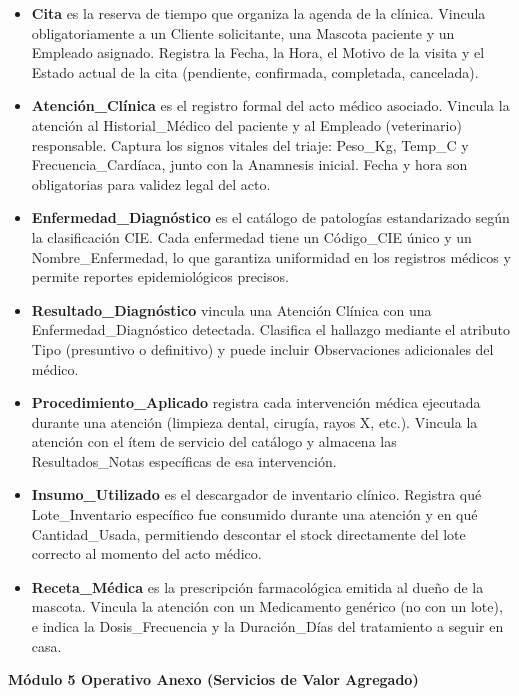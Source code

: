 \begin{itemize}
	\item \textbf{Cita} es la reserva de tiempo que organiza la agenda de la clínica. Vincula obligatoriamente a un Cliente solicitante, una Mascota paciente y un Empleado asignado. Registra la Fecha, la Hora, el Motivo de la visita y el Estado actual de la cita (pendiente, confirmada, completada, cancelada).
	\item \textbf{Atención\_Clínica} es el registro formal del acto médico asociado. Vincula la atención al Historial\_Médico del paciente y al Empleado (veterinario) responsable. Captura los signos vitales del triaje: Peso\_Kg, Temp\_C y Frecuencia\_Cardíaca, junto con la Anamnesis inicial. Fecha y hora son obligatorias para validez legal del acto.
	\item \textbf{Enfermedad\_Diagnóstico} es el catálogo de patologías estandarizado según la clasificación CIE. Cada enfermedad tiene un Código\_CIE único y un Nombre\_Enfermedad, lo que garantiza uniformidad en los registros médicos y permite reportes epidemiológicos precisos.
	\item \textbf{Resultado\_Diagnóstico} vincula una Atención Clínica con una Enfermedad\_Diagnóstico detectada. Clasifica el hallazgo mediante el atributo Tipo (presuntivo o definitivo) y puede incluir Observaciones adicionales del médico.
	\item \textbf{Procedimiento\_Aplicado} registra cada intervención médica ejecutada durante una atención (limpieza dental, cirugía, rayos X, etc.). Vincula la atención con el ítem de servicio del catálogo y almacena las Resultados\_Notas específicas de esa intervención.
	\item \textbf{Insumo\_Utilizado} es el descargador de inventario clínico. Registra qué Lote\_Inventario específico fue consumido durante una atención y en qué Cantidad\_Usada, permitiendo descontar el stock directamente del lote correcto al momento del acto médico.
	\item \textbf{Receta\_Médica} es la prescripción farmacológica emitida al dueño de la mascota. Vincula la atención con un Medicamento genérico (no con un lote), e indica la Dosis\_Frecuencia y la Duración\_Días del tratamiento a seguir en casa.
\end{itemize}

\vspace{0.5cm}
\noindent \textbf{Módulo 5 Operativo Anexo (Servicios de Valor Agregado)}

